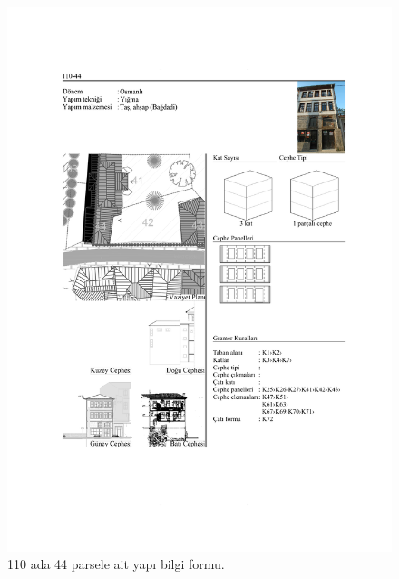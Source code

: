 \begin{figure}
\centering
\includegraphics[width=1\textwidth,height=\textheight]{source/figures/BilgiFormlari/110-44.pdf}
\caption{110 ada 44 parsele ait yapı bilgi formu.}
\end{figure}

